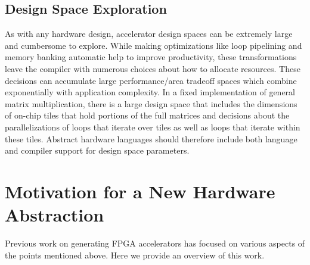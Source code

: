 \subsection{Design Space Exploration}
As with any hardware design, accelerator design spaces can be extremely large and cumbersome to explore.
While making optimizations like loop pipelining and memory banking automatic help to improve productivity, these transformations leave the compiler with numerous choices about how to allocate resources.
These decisions can accumulate large performance/area tradeoff spaces which combine exponentially with application complexity. In a fixed implementation
of general matrix multiplication, there is a large design space that includes the dimensions of on-chip tiles that hold portions of the full matrices and decisions
about the parallelizations of loops that iterate over tiles as well as loops that iterate within these tiles.
Abstract hardware languages should therefore include both language and compiler support for design space parameters.

\section{Motivation for a New Hardware Abstraction}
Previous work on generating FPGA accelerators has focused on various aspects of the points
mentioned above. Here we provide an overview of this work.

